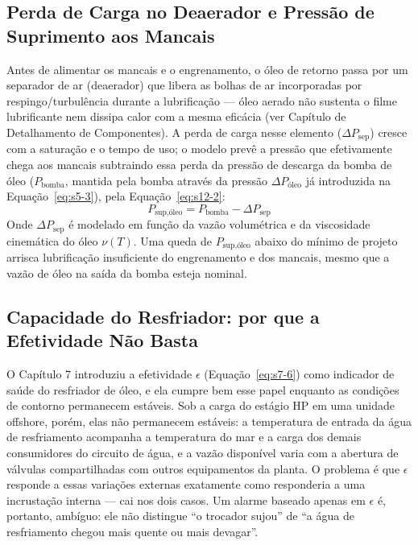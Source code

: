 \documentclass[12pt,a4paper]{article}
\numberwithin{equation}{section}
\numberwithin{table}{section}
\numberwithin{figure}{section}
\begin{document}
{	\subsection{\textbf{Perda de Carga no Deaerador e Pressão de Suprimento aos Mancais}}
	Antes de alimentar os mancais e o engrenamento, o óleo de retorno passa por um separador de ar (deaerador) que libera as bolhas de ar incorporadas por respingo/turbulência durante a lubrificação — óleo aerado não sustenta o filme lubrificante nem dissipa calor com a mesma eficácia (ver Capítulo de Detalhamento de Componentes). A perda de carga nesse elemento ($\Delta P_{\text{sep}}$) cresce com a saturação e o tempo de uso; o modelo prevê a pressão que efetivamente chega aos mancais subtraindo essa perda da pressão de descarga da bomba de óleo ($P_{\text{bomba}}$, mantida pela bomba através da pressão $\Delta P_{\text{óleo}}$ já introduzida na Equação~\eqref{eq:s5-3}), pela Equação~\eqref{eq:s12-2}:
	\begin{equation}\label{eq:s12-2}
 P_{\text{sup,óleo}} = P_{\text{bomba}} - \Delta P_{\text{sep}}
\end{equation}
	Onde $\Delta P_{\text{sep}}$ é modelado em função da vazão volumétrica e da viscosidade cinemática do óleo $\nu(T)$. Uma queda de $P_{\text{sup,óleo}}$ abaixo do mínimo de projeto arrisca lubrificação insuficiente do engrenamento e dos mancais, mesmo que a vazão de óleo na saída da bomba esteja nominal.

	\subsection{\textbf{Capacidade do Resfriador: por que a Efetividade Não Basta}}
	O Capítulo 7 introduziu a efetividade $\epsilon$ (Equação~\eqref{eq:s7-6}) como indicador de saúde do resfriador de óleo, e ela cumpre bem esse papel enquanto as condições de contorno permanecem estáveis. Sob a carga do estágio HP em uma unidade offshore, porém, elas não permanecem estáveis: a temperatura de entrada da água de resfriamento acompanha a temperatura do mar e a carga dos demais consumidores do circuito de água, e a vazão disponível varia com a abertura de válvulas compartilhadas com outros equipamentos da planta. O problema é que $\epsilon$ responde a essas variações externas exatamente como responderia a uma incrustação interna — cai nos dois casos. Um alarme baseado apenas em $\epsilon$ é, portanto, ambíguo: ele não distingue ``o trocador sujou'' de ``a água de resfriamento chegou mais quente ou mais devagar''.

}
\end{document}
